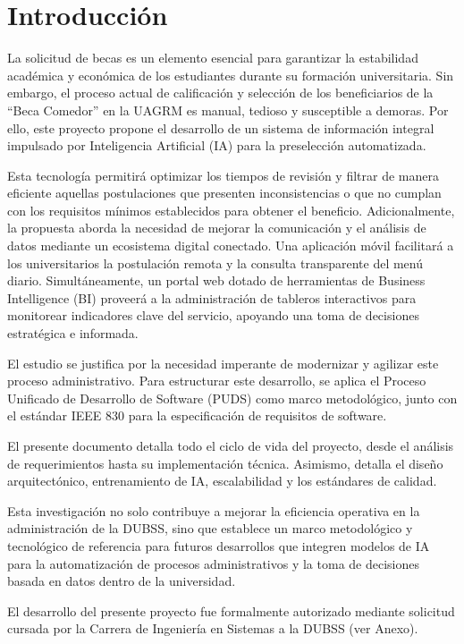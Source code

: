 \newpage
\section{Introducción}\label{sec:introduccion}

La solicitud de becas es un elemento esencial para garantizar la estabilidad académica y económica de los estudiantes durante su formación universitaria. Sin embargo, el proceso actual de calificación y selección de los beneficiarios de la \enquote{Beca Comedor} en la UAGRM es manual, tedioso y susceptible a demoras. Por ello, este proyecto propone el desarrollo de un sistema de información integral impulsado por Inteligencia Artificial (IA) para la preselección automatizada.

Esta tecnología permitirá optimizar los tiempos de revisión y filtrar de manera eficiente aquellas postulaciones que presenten inconsistencias o que no cumplan con los requisitos mínimos establecidos para obtener el beneficio. Adicionalmente, la propuesta aborda la necesidad de mejorar la comunicación y el análisis de datos mediante un ecosistema digital conectado. Una aplicación móvil facilitará a los universitarios la postulación remota y la consulta transparente del menú diario. Simultáneamente, un portal web dotado de herramientas de Business Intelligence (BI) proveerá a la administración de tableros interactivos para monitorear indicadores clave del servicio, apoyando una toma de decisiones estratégica e informada.

El estudio se justifica por la necesidad imperante de modernizar y agilizar este proceso administrativo. Para estructurar este desarrollo, se aplica el Proceso Unificado de Desarrollo de Software (PUDS) como marco metodológico, junto con el estándar IEEE 830 para la especificación de requisitos de software.

El presente documento detalla todo el ciclo de vida del proyecto, desde el análisis de requerimientos hasta su implementación técnica. Asimismo, detalla el diseño arquitectónico, entrenamiento de IA, escalabilidad y los estándares de calidad.

Esta investigación no solo contribuye a mejorar la eficiencia operativa en la administración de la DUBSS, sino que establece un marco metodológico y tecnológico de referencia para futuros desarrollos que integren modelos de IA para la automatización de procesos administrativos y la toma de decisiones basada en datos dentro de la universidad.

El desarrollo del presente proyecto fue formalmente autorizado mediante solicitud cursada por la Carrera de Ingeniería en Sistemas a la DUBSS (ver Anexo).
